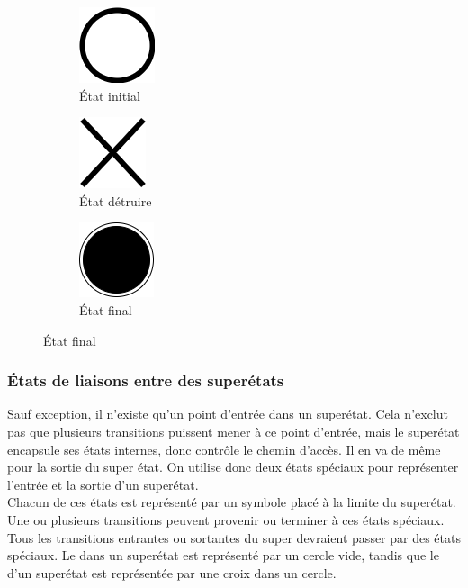 \begin{figure}[H]
	\caption{Représentation des états spéciaux ,  et  dans un \acrshort{DET}}
	\centering
	\begin{subfigure}[b]{0.3\textwidth}
		\centering
		\includegraphics[scale=0.4]{etats-speciaux1.png}
		\caption*{État initial}
	\end{subfigure}
	\hfill
	\begin{subfigure}[b]{0.3\textwidth}
		\centering
		\includegraphics[scale=0.4]{etats-speciaux2.png}
		\caption*{État détruire}
	\end{subfigure}
	\hfill
	\begin{subfigure}[b]{0.3\textwidth}
		\centering
		\includegraphics[scale=0.4]{etats-speciaux3.png}
		\caption*{État final}
	\end{subfigure}
\end{figure}

\subsubsection{États de liaisons entre des superétats}
\label{ssubsec:liaisons_superetats}

Sauf exception, il n'existe qu'un point d'entrée dans un superétat. Cela n'exclut pas que plusieurs transitions puissent mener à ce point d'entrée, mais le superétat encapsule ses états internes, donc contrôle le chemin d'accès. Il en va de même pour la sortie du super état. On utilise donc deux états spéciaux pour représenter l'entrée et la sortie d'un superétat.\\

Chacun de ces états est représenté par un symbole placé à la limite du superétat. Une ou plusieurs transitions peuvent provenir ou terminer à ces états spéciaux. Tous les transitions entrantes ou sortantes du super devraient passer par des états spéciaux. Le   dans un superétat est représenté par un cercle vide, tandis que le   d'un superétat est représentée par une croix dans un cercle.

